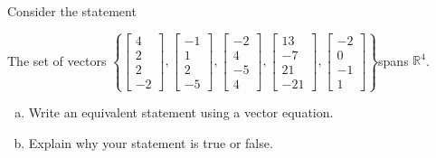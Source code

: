 
\begin{exerciseStatement}


Consider the statement 
\begin{center}\begin{minipage}{0.8\textwidth}
 The set of vectors \( \left\{ \left[\begin{array}{c}
4 \\
2 \\
2 \\
-2
\end{array}\right] , \left[\begin{array}{c}
-1 \\
1 \\
2 \\
-5
\end{array}\right] , \left[\begin{array}{c}
-2 \\
4 \\
-5 \\
4
\end{array}\right] , \left[\begin{array}{c}
13 \\
-7 \\
21 \\
-21
\end{array}\right] , \left[\begin{array}{c}
-2 \\
0 \\
-1 \\
1
\end{array}\right] \right\} \)spans \(\mathbb{R}^4\). 
\end{minipage}\end{center}
    


\begin{enumerate}[(a)]
\item  Write an equivalent statement using a vector equation.
\item  Explain why your statement is true or false.
\end{enumerate}
    
\end{exerciseStatement}
    
